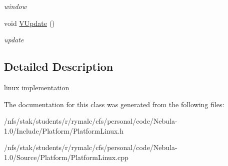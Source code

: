 \begin{DoxyCompactItemize}
\begin{DoxyCompactList}\small\item\em window \item\end{DoxyCompactList}\item 
\hypertarget{classPlatform_1_1PlatformLinux_a737169d31829402cbb3f6e7eaab57941}{
void \hyperlink{classPlatform_1_1PlatformLinux_a737169d31829402cbb3f6e7eaab57941}{VUpdate} ()}
\label{classPlatform_1_1PlatformLinux_a737169d31829402cbb3f6e7eaab57941}

\begin{DoxyCompactList}\small\item\em update \item\end{DoxyCompactList}\end{DoxyCompactItemize}


\subsection{Detailed Description}
linux implementation 

The documentation for this class was generated from the following files:\begin{DoxyCompactItemize}
\item 
/nfs/stak/students/r/rymalc/cfs/personal/code/Nebula-\/1.0/Include/Platform/PlatformLinux.h\item 
/nfs/stak/students/r/rymalc/cfs/personal/code/Nebula-\/1.0/Source/Platform/PlatformLinux.cpp\end{DoxyCompactItemize}
